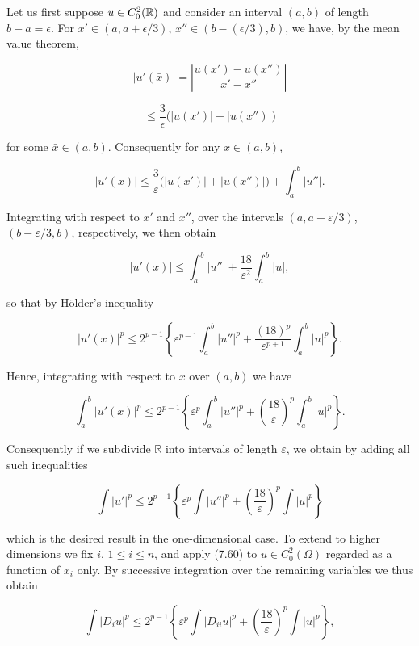Let us first suppose $u \in C^2_0(\mathbb{R})$ and consider an interval $(a,b)$ of length $b-a=\epsilon$. For $x' \in (a, a+\epsilon/3)$, $x'' \in (b-(\epsilon/3),b)$, we have, by the mean value theorem,

\[
|u'(\bar{x})| = \left| \frac{u(x') - u(x'')}{x' - x''} \right|
\]

\[
\le \frac{3}{\epsilon}\bigl(|u(x')| + |u(x'')|\bigr)
\]



for some $\bar{x}\in(a,b)$. Consequently for any $x\in(a,b)$,

\[
\lvert u'(x)\rvert \le \frac{3}{\varepsilon}\bigl(\lvert u(x')\rvert+\lvert u(x'')\rvert\bigr)+\int_a^b \lvert u''\rvert.
\]

Integrating with respect to $x'$ and $x''$, over the intervals $(a, a+\varepsilon/3)$, $(b-\varepsilon/3, b)$, respectively, we then obtain

\[
\lvert u'(x)\rvert \le \int_a^b \lvert u''\rvert+\frac{18}{\varepsilon^2}\int_a^b \lvert u\rvert,
\]

so that by H\"older's inequality

\[
\lvert u'(x)\rvert^p \le 2^{p-1}\left\{\varepsilon^{p-1}\int_a^b \lvert u''\rvert^p+\frac{(18)^p}{\varepsilon^{p+1}}\int_a^b \lvert u\rvert^p\right\}.
\]

Hence, integrating with respect to $x$ over $(a,b)$ we have

\[
\int_a^b \lvert u'(x)\rvert^p \le 2^{p-1}\left\{\varepsilon^p\int_a^b \lvert u''\rvert^p+\left(\frac{18}{\varepsilon}\right)^p\int_a^b \lvert u\rvert^p\right\}.
\]

Consequently if we subdivide $\mathbb{R}$ into intervals of length $\varepsilon$, we obtain by adding all such inequalities

\begin{equation}
\tag{7.60}
\int \lvert u'\rvert^p \le 2^{p-1}\left\{\varepsilon^p\int \lvert u''\rvert^p+\left(\frac{18}{\varepsilon}\right)^p\int \lvert u\rvert^p\right\}
\end{equation}

which is the desired result in the one-dimensional case. To extend to higher dimensions we fix $i$, $1\le i\le n$, and apply (7.60) to $u\in C_0^2(\Omega)$ regarded as a function of $x_i$ only. By successive integration over the remaining variables we thus obtain

\[
\int \lvert D_i u\rvert^p \le 2^{p-1}\left\{\varepsilon^p\int \lvert D_{ii}u\rvert^p+\left(\frac{18}{\varepsilon}\right)^p\int \lvert u\rvert^p\right\},
\]

